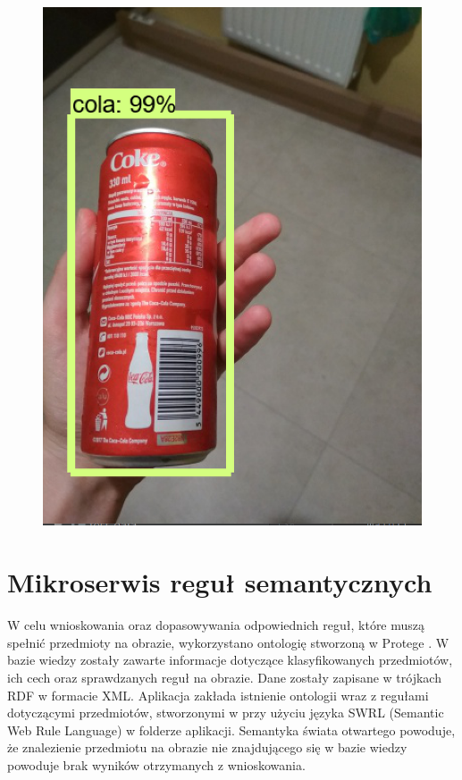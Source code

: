 {{\begin{figure}[htb]
\begin{minipage}{0.57\textwidth}
		\includegraphics[width=\linewidth]{"images/detection_sample_result2"}
	\end{minipage}
\end{figure}
}
\section{Mikroserwis reguł semantycznych}
{
W celu wnioskowania oraz dopasowywania odpowiednich reguł, które muszą spełnić przedmioty na obrazie, wykorzystano ontologię stworzoną w Protege \cite{Protege}. W bazie wiedzy zostały zawarte informacje dotyczące klasyfikowanych przedmiotów, ich cech oraz sprawdzanych reguł na obrazie. Dane zostały zapisane w trójkach RDF w formacie XML. Aplikacja zakłada istnienie ontologii wraz z regułami dotyczącymi przedmiotów, stworzonymi w przy użyciu języka SWRL\cite{SWRL} (Semantic Web Rule Language) w folderze aplikacji. Semantyka świata otwartego powoduje, że znalezienie przedmiotu na obrazie nie znajdującego się w bazie wiedzy powoduje brak wyników otrzymanych z wnioskowania.

}}
